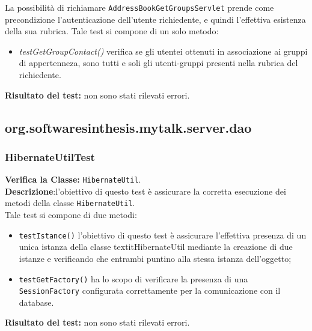 La possibilità di richiamare \texttt{AddressBookGetGroupsServlet} prende come precondizione l'autenticazione dell'utente richiedente, e quindi l'effettiva esistenza della sua rubrica.
Tale test si compone di un solo metodo:
\begin{itemize}
\item \textit{testGetGroupContact()} verifica se gli utentei ottenuti in associazione ai gruppi di appertenneza, sono tutti e soli gli utenti-gruppi presenti nella rubrica del richiedente.
\end{itemize}
\textbf{Risultato del test:} non sono stati rilevati errori.


\subsection{org.softwaresinthesis.mytalk.server.dao}

\subsubsection{HibernateUtilTest}
\textbf{Verifica la Classe:} \texttt{HibernateUtil}.\\
\textbf{Descrizione}:l'obiettivo di questo test è assicurare la corretta esecuzione dei metodi della classe \texttt{HibernateUtil}. \\
Tale test si compone di due metodi:
\begin{itemize}
\item \texttt{testIstance()} l'obiettivo di questo test è assicurare l'effettiva presenza di un unica istanza della classe textit{HibernateUtil} mediante la creazione di due istanze e verificando che entrambi puntino alla stessa istanza dell'oggetto;
\item \texttt{testGetFactory()} ha lo scopo di verificare la presenza di una \texttt{SessionFactory} configurata correttamente per la comunicazione con il database.
\end{itemize}
\textbf{Risultato del test:} non sono stati rilevati errori.

